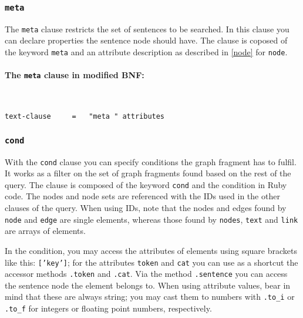\documentclass[12pt]{scrartcl}
\begin{document}
\subsubsection{\texttt{meta}}

The \texttt{meta} clause restricts the set of sentences to be searched.
In this clause you can declare properties the sentence node should have.
The clause is coposed of the keyword \texttt{meta} and an attribute description as described in \ref{node} for \texttt{node}.

\paragraph*{The \texttt{meta} clause in modified BNF:}
~
\begin{framed}
\begin{lstlisting}
text-clause     =   "meta " attributes
\end{lstlisting}
\end{framed}


\subsubsection{\texttt{cond}}\label{cond}

With the \texttt{cond} clause you can specify conditions the graph fragment has to fulfil.
It works as a filter on the set of graph fragments found based on the rest of the query.
The clause is composed of the keyword \texttt{cond} and the condition in Ruby code.
The nodes and node sets are referenced with the IDs used in the other clauses of the query.
When using IDs, note that the nodes and edges found by \texttt{node} and \texttt{edge} are single elements, whereas those found by \texttt{nodes}, \texttt{text} and \texttt{link} are arrays of elements.

In the condition, you may access the attributes of elements using square brackets like this: \texttt{['key']}; for the attributes \texttt{token} and \texttt{cat} you can use as a shortcut the accessor methods \texttt{.token} and \texttt{.cat}.
Via the method \texttt{.sentence} you can access the sentence node the element belongs to.
When using attribute values, bear in mind that these are always string; you may cast them to numbers with \texttt{.to\_i} or \texttt{.to\_f} for integers or floating point numbers, respectively.
\end{document}
